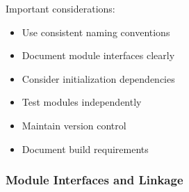 \begin{remark}
Important considerations:
\begin{itemize}
  \item Use consistent naming conventions
  \item Document module interfaces clearly
  \item Consider initialization dependencies
  \item Test modules independently
  \item Maintain version control
  \item Document build requirements
\end{itemize}
\end{remark}



\subsubsection{Module Interfaces and Linkage}

